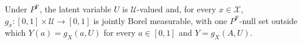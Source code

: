 Under \(P^{\mathrm F}\), the latent variable \(U\) is \(\mathcal U\)-valued and, for every \(x\in\mathcal X\), \(g_x:[0,1]\times\mathcal U\to[0,1]\) is jointly Borel measurable, with one \(P^{\mathrm F}\)-null set outside which \(Y(a)=g_X(a,U)\) for every \(a\in[0,1]\) and \(Y=g_X(A,U)\).